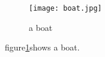\documentclass{article}
\begin{document}
    \begin{figure}
	\texttt{[image: boat.jpg]}
	\caption{a boat}
	\label{fig:boat1}
\end{figure}
figure\ref{fig:boat1}shows a boat.
\end{document}
